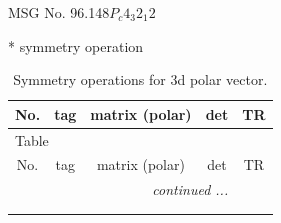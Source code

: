 \documentclass[fleqn,8pt]{jsarticle}
\begin{document}
\setcounter{MaxMatrixCols}{32}

\renewcommand{\tablename}{Table~}
\renewcommand{\figurename}{Figure~}
\begin{center}
\LARGE
MSG No. 96.148\quad$P_{c}4_{3}2_{1}2$
\end{center}
* symmetry operation
\renewcommand{\arraystretch}{1.3}
\begin{longtable}{ccccc}
\caption{Symmetry operations for 3d polar vector.}
 \\
 \hline \hline
No. & tag & matrix (polar) & det & TR \\ \hline \endfirsthead

\multicolumn{4}{l}{\tablename\ \thetable{}} \\
 \hline \hline
No. & tag & matrix (polar) & det & TR \\ \hline \endhead

 \hline \hline
\multicolumn{4}{r}{\footnotesize\it continued ...} \\ \endfoot

 \hline \hline
\multicolumn{4}{r}{} \\ \endlastfoot


\end{longtable}
\end{document}
